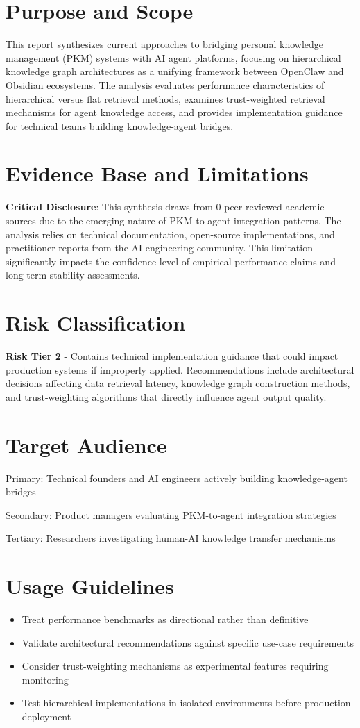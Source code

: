 \documentclass[a4paper,11pt]{article}
\begin{document}
\section{Purpose and Scope}
This report synthesizes current approaches to bridging personal knowledge management (PKM) systems with AI agent platforms, focusing on hierarchical knowledge graph architectures as a unifying framework between OpenClaw and Obsidian ecosystems. The analysis evaluates performance characteristics of hierarchical versus flat retrieval methods, examines trust-weighted retrieval mechanisms for agent knowledge access, and provides implementation guidance for technical teams building knowledge-agent bridges.


\section{Evidence Base and Limitations}
\textbf{Critical Disclosure}: This synthesis draws from 0 peer-reviewed academic sources due to the emerging nature of PKM-to-agent integration patterns. The analysis relies on technical documentation, open-source implementations, and practitioner reports from the AI engineering community. This limitation significantly impacts the confidence level of empirical performance claims and long-term stability assessments.


\section{Risk Classification}
\textbf{Risk Tier 2} - Contains technical implementation guidance that could impact production systems if improperly applied. Recommendations include architectural decisions affecting data retrieval latency, knowledge graph construction methods, and trust-weighting algorithms that directly influence agent output quality.


\section{Target Audience}
Primary: Technical founders and AI engineers actively building knowledge-agent bridges

Secondary: Product managers evaluating PKM-to-agent integration strategies

Tertiary: Researchers investigating human-AI knowledge transfer mechanisms


\section{Usage Guidelines}
\begin{itemize}
  \item Treat performance benchmarks as directional rather than definitive
  \item Validate architectural recommendations against specific use-case requirements
  \item Consider trust-weighting mechanisms as experimental features requiring monitoring
  \item Test hierarchical implementations in isolated environments before production deployment
\end{itemize}
\end{document}
